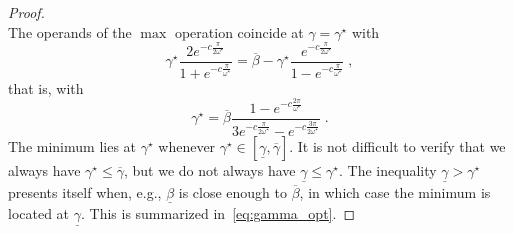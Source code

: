 \documentclass[10pt,a4paper]{amsart}
\begin{document}
\begin{proof}
\begin{displaymath}
    \end{displaymath}
    The operands of the $\max$ operation coincide at $\gamma = \gamma^\star$ with
    \begin{displaymath}
        \gamma^\star \frac{2e^{-c\frac{\pi}{2\omega^\star}}}{1 + e^{-c\frac{\pi}{\omega^\star}}} = \overline{\beta} - \gamma^\star\frac{e^{-c\frac{\pi}{2\omega^\star}}}{1 - e^{-c\frac{\pi}{\omega^\star}}} \;,
    \end{displaymath}
    that is, with
    \begin{displaymath}
        \gamma^\star = \overline{\beta} \frac{1 - e^{-c\frac{2\pi}{\omega^\star}}}{3e^{-c\frac{\pi}{2\omega^\star}} - e^{-c\frac{3\pi}{2\omega^\star}}} \;.
    \end{displaymath}
    The minimum lies at $\gamma^\star$ whenever $\gamma^\star \in [\underline{\gamma},\overline{\gamma}]$.
    It is not difficult to verify that we always have $\gamma^\star \le \overline{\gamma}$, but we do not always have $\underline{\gamma} \le \gamma^\star$. The inequality $\underline{\gamma} > \gamma^\star$ presents itself when, e.g., $\underline{\beta}$ is close enough to $\overline{\beta}$, in which case the minimum is located at $\underline{\gamma}$. This is summarized in~\eqref{eq:gamma_opt}.
\end{proof}
\end{document}
